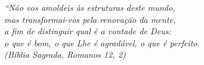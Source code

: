\documentclass[
12pt,				%
openright,			%
twoside,			%
a4paper,			%
hyphens,
english,			%
french,				%
spanish,			%
brazil				%
]{abntex2}
\begin{document}
			
		
		
			
		
		\begin{epigrafe}
			\vspace*{\fill}
			\begin{flushright}
				\textit{``Não vos amoldeis às estruturas deste mundo, \\
					mas transformai-vos pela renovação da mente, \\
					a fim de distinguir qual é a vontade de Deus: \\
					o que é bom, o que Lhe é agradável, o que é perfeito.\\
					(Bíblia Sagrada, Romanos 12, 2)}
			\end{flushright}
		\end{epigrafe}
		
\end{document}
